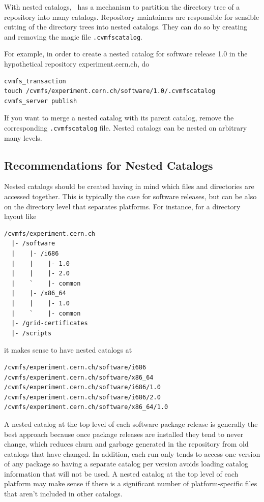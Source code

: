 With nested catalogs, \cvmfs\ has a mechanism to partition the directory tree of a repository into many catalogs. 
Repository maintainers are responsible for sensible cutting of the directory trees into nested catalogs. 
They can do so by creating and removing the magic file \texttt{.cvmfscatalog}.

For example, in order to create a nested catalog for software release 1.0 in the hypothetical repository experiment.cern.ch, do
\begin{verbatim}
cvmfs_transaction
touch /cvmfs/experiment.cern.ch/software/1.0/.cvmfscatalog
cvmfs_server publish
\end{verbatim}

If you want to merge a nested catalog with its parent catalog, remove the corresponding \texttt{.cvmfscatalog} file. 
Nested catalogs can be nested on arbitrary many levels.

\subsection{Recommendations for Nested Catalogs}
\label{sct:nestedcatalogrecommendations}
Nested catalogs should be created having in mind which files and directories are accessed together. 
This is typically the case for software releases, but can be also on the directory level that separates platforms. 
For instance, for a directory layout like
\begin{verbatim}
/cvmfs/experiment.cern.ch
  |- /software
  |    |- /i686
  |    |    |- 1.0
  |    |    |- 2.0
  |    `    |- common
  |    |- /x86_64
  |    |    |- 1.0
  |    `    |- common  
  |- /grid-certificates
  |- /scripts 
\end{verbatim}
it makes sense to have nested catalogs at
\begin{verbatim}
/cvmfs/experiment.cern.ch/software/i686
/cvmfs/experiment.cern.ch/software/x86_64
/cvmfs/experiment.cern.ch/software/i686/1.0
/cvmfs/experiment.cern.ch/software/i686/2.0
/cvmfs/experiment.cern.ch/software/x86_64/1.0 
\end{verbatim}

A nested catalog at the top level of each software package release is generally the best approach because once package releases are installed they tend to never change, which reduces churn and garbage generated in the repository from old catalogs that have changed. 
In addition, each run only tends to access one version of any package so having a separate catalog per version avoids loading catalog information that will not be used.
A nested catalog at the top level of each platform may make sense if there is a significant number of platform-specific files that aren't included in other catalogs.

